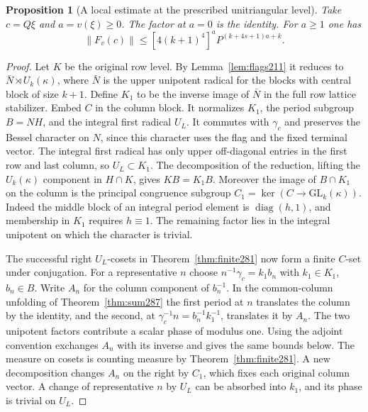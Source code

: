 \documentclass[a4paper,11pt]{article}
\newtheorem{proposition}{Proposition}[section]
\theoremstyle{definition}
\theoremstyle{remark}
\numberwithin{equation}{section}
\begin{document}
\begin{proposition}[A local estimate at the prescribed unitriangular level]\leavevmode
\label{prop:markedpowers292}
Take \(c=Q\xi\) and \(a=v(\xi)\ge0\). The factor at \(a=0\)
is the identity. For \(a\ge1\) one has
\[
  \|F_v(c)\| \le [4(k+1)^4]^a
                           P^{(k+4s+1)a+k}.
\]
\end{proposition}
\begin{proof}
Let \(K\) be the original row level. By
Lemma~\ref{lem:flags211} it reduces to
\(\bar N\rtimes U_k(\kappa)\), where \(\bar N\) is the
upper unipotent radical for the blocks with central block
of size \(k+1\). Define \(K_1\) to be the inverse image
of \(\bar N\) in the full row lattice stabilizer. Embed
\(C\) in the column block. It normalizes \(K_1\), the
period subgroup \(B=NH\), and the integral first radical
\(U_L\). It commutes with \(\gamma_c\) and preserves the
Bessel character on \(N\), since this character uses the
flag and the fixed terminal vector. The integral first
radical has only upper off-diagonal entries in the first
row and last column, so \(U_L\subset K_1\). The decomposition
of the reduction, lifting the \(U_k(\kappa)\) component
in \(H\cap K\), gives \(KB=K_1B\). Moreover the image
of \(B\cap K_1\) on the column is the principal congruence
subgroup \(C_1=\ker(C\to\mathrm{GL}_k(\kappa))\).
Indeed the middle block of an integral period element is
\(\operatorname{diag}(h,1)\), and membership in \(K_1\)
requires \(h\equiv1\). The remaining factor lies in the
integral unipotent on which the character is trivial.

The successful right \(U_L\)-cosets in
Theorem~\ref{thm:finite281} now form a finite \(C\)-set
under conjugation. For a representative \(n\) choose
\(n^{-1}\gamma_c=k_1 b_n\) with \(k_1\in K_1\), \(b_n\in B\).
Write \(A_n\) for the column component of \(b_n^{-1}\).
In the common-column unfolding of Theorem~\ref{thm:sum287}
the first period at \(n\) translates the column by the
identity, and the second, at \(\gamma_c^{-1}n=b_n^{-1}k_1^{-1}\),
translates it by \(A_n\). The two unipotent factors
contribute a scalar phase of modulus one. Using the adjoint
convention exchanges \(A_n\) with its inverse and gives
the same bounds below. The measure on cosets is counting
measure by Theorem~\ref{thm:finite281}. A new decomposition
changes \(A_n\) on the right by \(C_1\), which fixes each
original column vector. A change of representative \(n\)
by \(U_L\) can be absorbed into \(k_1\), and its phase is
trivial on \(U_L\).


\end{proof}
\end{document}

